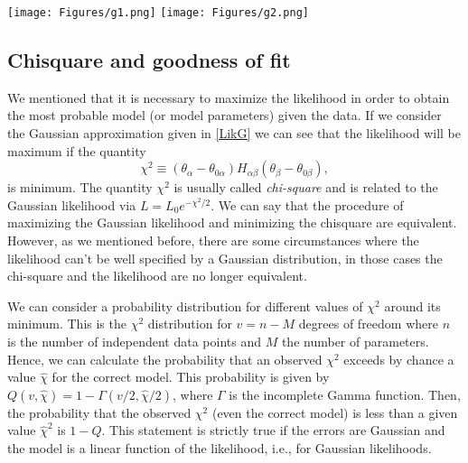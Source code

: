 \documentclass[onecolumn,           %
               showpacs,            %
               preprintnumbers,     %
               aps,                 %
               letterpaper,             %
               superscriptaddress,      %
               nofootinbib,         %
               tightenlines,        %
               floats,floatfix      %
               ,usenatbib,
               ]{revtex4-1}
\begin{document}
\begin{minipage}{\textwidth}
\centering
\texttt{[image: Figures/g1.png]}
\texttt{[image: Figures/g2.png]}
\label{gausian1}
\end{minipage}
\subsection{Chisquare and goodness of fit}

We mentioned that it is necessary to maximize the likelihood in order to obtain the most probable model (or model parameters) given the data. If we consider the Gaussian approximation given in \eqref{LikG} we can see that the likelihood will be maximum if the quantity
\begin{equation}\label{chi2}
\chi^2\equiv(\theta_\alpha-\theta_{0\alpha})H_{\alpha\beta}(\theta_\beta-\theta_{0\beta}),
\end{equation}
is minimum. The quantity $\chi^2$ is usually called \textit{chi-square} and is related to the Gaussian likelihood via $L=L_0e^{-\chi^2/2}$. We can say that the procedure of maximizing the Gaussian likelihood and minimizing the chisquare are equivalent. However, as we mentioned before, there are some circumstances where the likelihood can't be well specified by a Gaussian distribution, in those cases the chi-square and the likelihood are no longer equivalent. 

We can consider a probability distribution for different values of $\chi^2$ around its minimum. This is the $\chi^2$ distribution for $v=n-M$ degrees of freedom where $n$ is the number of independent data points and $M$ the number of parameters. Hence, we can calculate the probability that an observed $\chi^2$ exceeds by chance a value $\hat \chi$ for the correct model. This probability is given by \cite{NR} $Q(v,\hat\chi)=1-\Gamma(v/2,\hat\chi/2)$, where $\Gamma$ is the incomplete Gamma function. Then, the probability that the observed $\chi^2$ (even the correct model) is less than a given value $\hat\chi^2$ is $1-Q$. This statement is strictly true if the errors are Gaussian and the model is a linear function of the likelihood, i.e., for Gaussian likelihoods.
\end{document}
